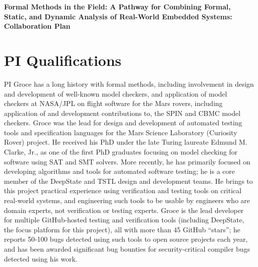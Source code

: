 \documentclass{article}
\begin{document}
\begin{center}
{\Large\sf\textbf{Formal Methods in the Field: A Pathway for Combining Formal, Static, and Dynamic Analysis of Real-World Embedded Systems: Collaboration Plan}}
\end{center}

\section{PI Qualifications}

PI Groce has a long history with formal methods, including involvement in design and development of well-known model checkers, and application of model checkers at NASA/JPL on flight software for the Mars rovers, including application of and development contributions to, the SPIN and CBMC model checkers.  Groce was the lead for design and development of automated testing tools and specification languages for the Mars Science Laboratory (Curiosity Rover) project.  He received his PhD under the late Turing laureate Edmund M. Clarke, Jr., as one of the first PhD graduates focusing on model checking for software using SAT and SMT solvers.  More recently, he has primarily focused on developing algorithms and tools for automated software testing; he is a core member of the DeepState and TSTL design and development teams.  He brings to this project practical experience using verification and testing tools on critical real-world systems, and engineering such tools to be usable by engineers who are domain experts, not verification or testing experts.  Groce is the lead developer for multiple GitHub-hosted testing and verification tools (including DeepState, the focus platform for this project), all with more than 45 GitHub ``stars''; he reports 50-100 bugs detected using such tools to open source projects each year, and has been awarded significant bug bounties for security-critical compiler bugs detected using his work.
\end{document}
